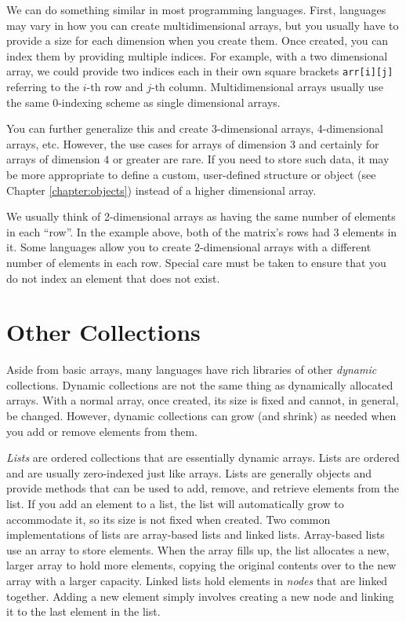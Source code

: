 We can do something similar in most programming languages.  First,
languages may vary in how you can create multidimensional arrays, but
you usually have to provide a size for each dimension when you create 
them.  Once created, you can index them by providing multiple indices.
For example, with a two dimensional array, we could provide two indices
each in their own square brackets \texttt{arr[i][j]} referring to the
$i$-th row and $j$-th column.  Multidimensional arrays usually use the 
same 0-indexing scheme as single dimensional arrays.

You can further generalize this and create 3-dimensional arrays, 4-dimensional
arrays, etc.  However, the use cases for arrays of dimension 3 and
certainly for arrays of dimension $4$ or greater are rare.  If you 
need to store such data, it may be more appropriate to define a 
custom, user-defined structure or object (see Chapter \ref{chapter:objects})
instead of a higher dimensional array.

We usually think of 2-dimensional arrays as having the same number
of elements in each ``row''.  In the example above, both of the matrix's
rows had 3 elements in it.  Some languages allow you to create
2-dimensional arrays with a different number of elements in each
row.  Special care must be taken to ensure that you do not index an 
element that does not exist.

\section{Other Collections}

Aside from basic arrays, many languages have rich libraries of other
\emph{dynamic} collections.  Dynamic collections are not the same
thing as dynamically allocated arrays.  With a normal array, once 
created, its size is fixed and cannot, in general, be changed.  However,
dynamic collections can grow (and shrink) as needed when you 
add or remove elements from them.

\emph{Lists} are ordered collections that are essentially dynamic arrays.  
Lists are ordered and are usually zero-indexed just like arrays.  Lists
are generally objects and provide methods that can be used to add, 
remove, and retrieve elements from the list.  If you add an element
to a list, the list will automatically grow to accommodate it, so its size
is not fixed when created.  Two common implementations of lists are
array-based lists and linked lists.  Array-based lists use an array to
store elements.  When the array fills up, the list allocates a new, 
larger array to hold more elements, copying the original contents
over to the new array with a larger capacity.  Linked lists hold elements
in \emph{nodes} that are linked together.  Adding a new element
simply involves creating a new node and linking it to the last element
in the list.

